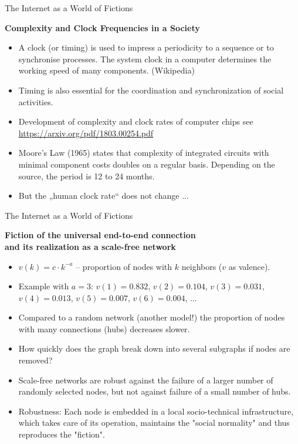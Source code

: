 \documentclass{beamer}
\newcommand{\ueberschrift}[1]{\begin{center}\bf #1\end{center}}
\begin{document}
\begin{frame}{The Internet as a World of Fictions}
\ueberschrift{Complexity and Clock Frequencies in a Society}
\begin{itemize}
\item A clock (or timing) is used to impress a periodicity to a sequence or to
  synchronise processes. The system clock in a computer determines the working
  speed of many components. (Wikipedia)
\item Timing is also essential for the coordination and synchronization of
  social activities.
\item Development of complexity and clock rates of computer chips see
  \url{https://arxiv.org/pdf/1803.00254.pdf}
\item Moore's Law (1965) states that complexity of integrated circuits with
  minimal component costs doubles on a regular basis. Depending on the source,
  the period is 12 to 24 months.
\item But the „human clock rate“ does not change ...
\end{itemize}\vspace*{2em}
\end{frame}

\begin{frame}{The Internet as a World of Fictions}
\ueberschrift{Fiction of the universal end-to-end connection\\ and its
  realization as a scale-free network}\scriptsize
\begin{itemize}
\item $v(k)=c\cdot k^{-a}$ -- proportion of nodes with $k$ neighbors ($v$ as
  valence).
\item Example with $a=3$: $v(1)=0.832$, $v(2)=0.104$, $v(3)=0.031$,
  $v(4)=0.013$, $v(5)=0.007$, $v(6)=0.004$, ...
\item Compared to a random network (another model!) the proportion of
  nodes with many connections (hubs) decreases slower.
\item How quickly does the graph break down into several subgraphs if nodes
  are removed?
\item Scale-free networks are robust against the failure of a larger number of
  randomly selected nodes, but not against failure of a small number of hubs.
\item Robustness: Each node is embedded in a local socio-technical
  infrastructure, which takes care of its operation, maintains the "social
  normality" and thus reproduces the "fiction".
\end{itemize}
\end{frame}
\end{document}
